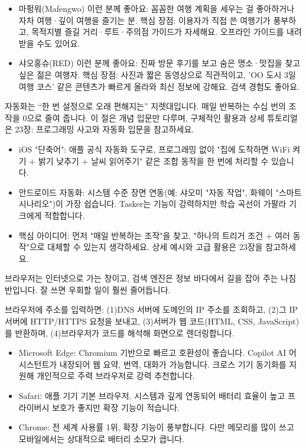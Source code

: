 
\begin{itemize}
  \item 마펑워(Mafengwo) 이런 분께 좋아요: 꼼꼼한 여행 계획을 세우는 걸 좋아하거나 자차 여행·깊이 여행을 즐기는 분. 핵심 장점: 이용자가 직접 쓴 여행기가 풍부하고, 목적지별 즐길 거리·루트·주의점 가이드가 자세해요. 오프라인 가이드를 내려받을 수도 있어요.
  \item 샤오홍슈(RED) 이런 분께 좋아요: 진짜 방문 후기를 보고 숨은 명소·맛집을 찾고 싶은 젊은 여행자. 핵심 장점: 사진과 짧은 동영상으로 직관적이고, 'OO 도시 3일 여행 코스' 같은 콘텐츠가 빠르게 올라와 최신 정보에 강해요. 검색 경험도 좋아요.
\end{itemize}


자동화는 “한 번 설정으로 오래 편해지는” 지렛대입니다. 매일 반복하는 수십 번의 조작을 0으로 줄여 줍니다. 이 절은 개념 입문만 다루며, 구체적인 활용과 상세 튜토리얼은 23장: 프로그래밍 사고와 자동화 입문을 참고하세요.

\begin{itemize}
  \item iOS "단축어": 애플 공식 자동화 도구로, 프로그래밍 없이 "집에 도착하면 WiFi 켜기 + 밝기 낮추기 + 날씨 읽어주기" 같은 조합 동작을 한 번에 처리할 수 있습니다.
  \item 안드로이드 자동화: 시스템 수준 장면 연동(예: 샤오미 "자동 작업", 화웨이 "스마트 시나리오")이 가장 쉽습니다. Tasker는 기능이 강력하지만 학습 곡선이 가팔라 기크에게 적합합니다.
  \item 핵심 아이디어: 먼저 "매일 반복하는 조작"을 찾고, "하나의 트리거 조건 + 여러 동작"으로 대체할 수 있는지 생각하세요. 상세 예시와 고급 활용은 23장을 참고하세요.
\end{itemize}


브라우저는 인터넷으로 가는 창이고, 검색 엔진은 정보 바다에서 길을 잡아 주는 나침반입니다. 잘 쓰면 우회할 일이 훨씬 줄어듭니다.


브라우저에 주소를 입력하면: (1)DNS 서버에 도메인의 IP 주소를 조회하고, (2)그 IP 서버에 HTTP/HTTPS 요청을 보내고, (3)서버가 웹 코드(HTML, CSS, JavaScript)를 반환하며, (4)브라우저가 코드를 해석해 화면으로 렌더링합니다.


\begin{itemize}
  \item Microsoft Edge: Chromium 기반으로 빠르고 호환성이 좋습니다. Copilot AI 어시스턴트가 내장되어 웹 요약, 번역, 대화가 가능합니다. 크로스 기기 동기화를 지원해 개인적으로 주력 브라우저로 강력 추천합니다.
  \item Safari: 애플 기기 기본 브라우저. 시스템과 깊게 연동되어 배터리 효율이 높고 프라이버시 보호가 좋지만 확장 기능이 적습니다.
  \item Chrome: 전 세계 사용률 1위, 확장 기능이 풍부합니다. 다만 메모리를 많이 쓰고 모바일에서는 상대적으로 배터리 소모가 큽니다.
\end{itemize}


